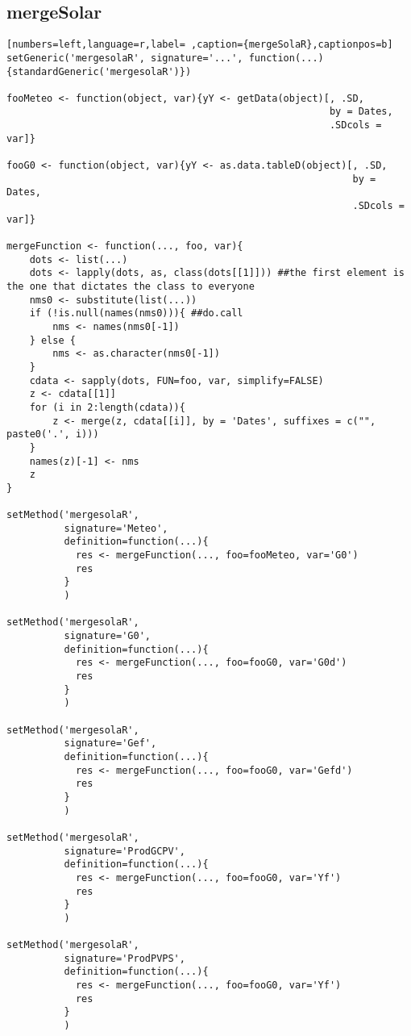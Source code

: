 \subsection{mergeSolar}
\label{sec:orgd58bdf8}
\begin{lstlisting}[numbers=left,language=r,label= ,caption={mergeSolaR},captionpos=b]
setGeneric('mergesolaR', signature='...', function(...){standardGeneric('mergesolaR')})

fooMeteo <- function(object, var){yY <- getData(object)[, .SD,
                                                        by = Dates,
                                                        .SDcols = var]}

fooG0 <- function(object, var){yY <- as.data.tableD(object)[, .SD,
                                                            by = Dates,
                                                            .SDcols = var]}

mergeFunction <- function(..., foo, var){
    dots <- list(...)
    dots <- lapply(dots, as, class(dots[[1]])) ##the first element is the one that dictates the class to everyone
    nms0 <- substitute(list(...))
    if (!is.null(names(nms0))){ ##do.call
        nms <- names(nms0[-1])
    } else { 
        nms <- as.character(nms0[-1])
    }
    cdata <- sapply(dots, FUN=foo, var, simplify=FALSE)
    z <- cdata[[1]]
    for (i in 2:length(cdata)){
        z <- merge(z, cdata[[i]], by = 'Dates', suffixes = c("", paste0('.', i)))
    }
    names(z)[-1] <- nms
    z
}

setMethod('mergesolaR',
          signature='Meteo',
          definition=function(...){
            res <- mergeFunction(..., foo=fooMeteo, var='G0')
            res
          }
          )

setMethod('mergesolaR',
          signature='G0',
          definition=function(...){
            res <- mergeFunction(..., foo=fooG0, var='G0d')
            res
          }
          )

setMethod('mergesolaR',
          signature='Gef',
          definition=function(...){
            res <- mergeFunction(..., foo=fooG0, var='Gefd')
            res
          }
          )

setMethod('mergesolaR',
          signature='ProdGCPV',
          definition=function(...){
            res <- mergeFunction(..., foo=fooG0, var='Yf')
            res
          }
          )

setMethod('mergesolaR',
          signature='ProdPVPS',
          definition=function(...){
            res <- mergeFunction(..., foo=fooG0, var='Yf')
            res
          }
          )
\end{lstlisting}
